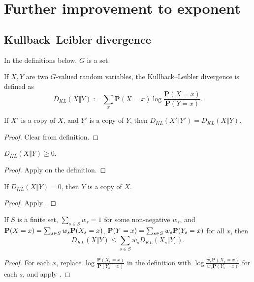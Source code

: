 \chapter{Further improvement to exponent}

\section{Kullback--Leibler divergence}

In the definitions below, $G$ is a set.

\begin{definition}\label{kl-div} If $X,Y$ are two $G$-valued random variables, the Kullback--Leibler divergence is defined as
  $$ D_{KL}(X\Vert Y) := \sum_x \mathbf{P}(X=x) \log \frac{\mathbf{P}(X=x)}{\mathbf{P}(Y=x)}.$$
\end{definition}

\begin{lemma}\label{kl-div-copy}  If $X'$ is a copy of $X$, and $Y'$ is a copy of $Y$, then $D_{KL}(X'\Vert Y') = D_{KL}(X\Vert Y)$.
\end{lemma}

\begin{proof}  Clear from definition.
\end{proof}

\begin{lemma}\label{Gibbs}  $D_{KL}(X\Vert Y) \geq 0$.
\end{lemma}

\begin{proof} 
  Apply  on the definition.
\end{proof}

\begin{lemma}\label{Gibbs-converse}  If $D_{KL}(X\Vert Y) = 0$, then $Y$ is a copy of $X$.
\end{lemma}

\begin{proof} 
  Apply .
\end{proof}

\begin{lemma}\label{kl-div-convex}  If $S$ is a finite set, $\sum_{s \in S} w_s = 1$ for some non-negative $w_s$, and ${\bf P}(X=x) = \sum_{s\in S} w_s  {\bf P}(X_s=x)$, ${\bf P}(Y=x) = \sum_{s\in S} w_s  {\bf P}(Y_s=x)$ for all $x$, then
$$D_{KL}(X\Vert Y) \le \sum_{s\in S} w_s D_{KL}(X_s\Vert Y_s).$$
\end{lemma}
\begin{proof}
For each $x$, replace $\log \frac{\mathbf{P}(X_s=x)}{\mathbf{P}(Y_s=x)}$ in the definition with $\log \frac{w_s\mathbf{P}(X_s=x)}{w_s\mathbf{P}(Y_s=x)}$ for each $s$, and apply .
\end{proof}



